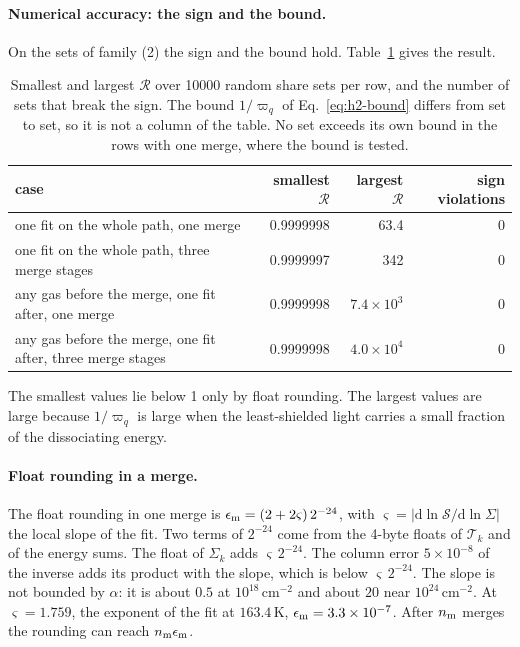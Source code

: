 \paragraph{Numerical accuracy: the sign and the bound.} On the sets of
family (2) the sign and the bound hold. Table~\ref{tab:h2-scan} gives the
result.

\begin{table}[htbp]
\centering
\caption{Smallest and largest $\mathcal R$ over 10000 random share sets per row,
and the number of sets that break the sign. The bound $1/\varpi_q$ of
Eq.~\eqref{eq:h2-bound} differs from set to set, so it is not a column of the
table. No set exceeds its own bound in the rows with one merge, where the bound
is tested.}
\label{tab:h2-scan}
\begin{tabular}{p{7.6cm}rrr}
\toprule
case & smallest $\mathcal R$ & largest $\mathcal R$ & sign violations \\
\midrule
one fit on the whole path, one merge & 0.9999998 & 63.4 & 0 \\
one fit on the whole path, three merge stages & 0.9999997 & 342 & 0 \\
any gas before the merge, one fit after, one merge & 0.9999998 & $7.4\times10^{3}$ & 0 \\
any gas before the merge, one fit after, three merge stages & 0.9999998 & $4.0\times10^{4}$ & 0 \\
\bottomrule
\end{tabular}
\end{table}

The smallest values lie below 1 only by float rounding. The largest values
are large because $1/\varpi_q$ is large when the least-shielded light carries a
small fraction of the dissociating energy.

\paragraph{Float rounding in a merge.} The float rounding in one merge is
$\epsilon_{\rm m}=(2+2\varsigma)\,2^{-24}$, with
$\varsigma=|\mathrm d\ln\mathcal S/\mathrm d\ln\Sigma|$ the local slope of the
fit. Two terms of $2^{-24}$ come from the 4-byte floats of $\mathcal T_k$ and
of the energy sums. The float of $\Sigma_k$ adds $\varsigma\,2^{-24}$. The
column error $5\times10^{-8}$ of the inverse adds its product with the slope,
which is below $\varsigma\,2^{-24}$. The slope is not bounded by
$\alpha$: it is about $0.5$ at $10^{18}$\,cm$^{-2}$ and about $20$ near
$10^{24}$\,cm$^{-2}$. At $\varsigma=1.759$, the exponent of the fit at
$163.4$\,K, $\epsilon_{\rm m}=3.3\times10^{-7}$. After $n_{\rm m}$ merges the
rounding can reach $n_{\rm m}\epsilon_{\rm m}$.

